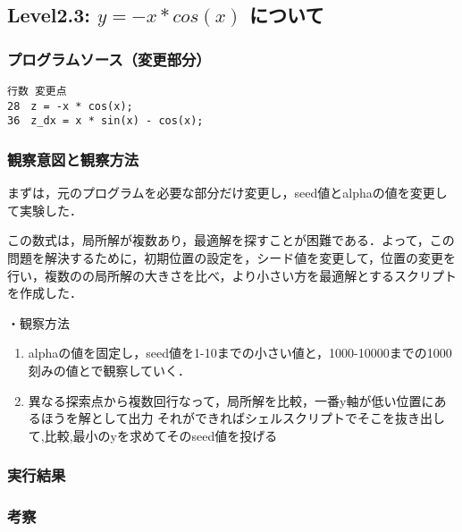 \subsection{Level2.3: $y=-x*cos(x)$ について}
\subsubsection{プログラムソース（変更部分）}
\begin{breakbox}
\begin{verbatim}
行数 変更点
28　z = -x * cos(x);
36　z_dx = x * sin(x) - cos(x);
\end{verbatim}
\end{breakbox}

\subsubsection{観察意図と観察方法}
まずは，元のプログラムを必要な部分だけ変更し，seed値とalphaの値を変更して実験した．

この数式は，局所解が複数あり，最適解を探すことが困難である．よって，この問題を解決するために，初期位置の設定を，シード値を変更して，位置の変更を行い，複数のの局所解の大きさを比べ，より小さい方を最適解とするスクリプトを作成した．

・観察方法
\begin{enumerate}
	\item alphaの値を固定し，seed値を1-10までの小さい値と，1000-10000までの1000刻みの値とで観察していく．
	\item 異なる探索点から複数回行なって，局所解を比較，一番y軸が低い位置にあるほうを解として出力
	それができればシェルスクリプトでそこを抜き出して,比較,最小のyを求めてそのseed値を投げる
\end{enumerate}

\subsubsection{実行結果}

\subsubsection{考察}

